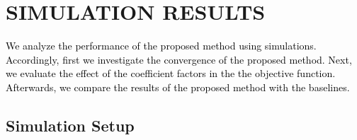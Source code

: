 \documentclass[20pt,twocolumn]{IEEEtran}
\begin{document}
\section{SIMULATION RESULTS}\label{Simulation_Results}
\textcolor{black}{We analyze the  performance of the proposed method  using simulations. Accordingly, first we investigate the convergence of the proposed method. Next, we evaluate the effect of the coefficient factors in the the objective function. Afterwards, we compare the  results of the proposed method with the baselines.}
\subsection{{Simulation Setup}}
\begin{table}[]
	\caption{Simulation Setting}
	\centering
	\label{tab:setting}
\end{table}
\end{document}
